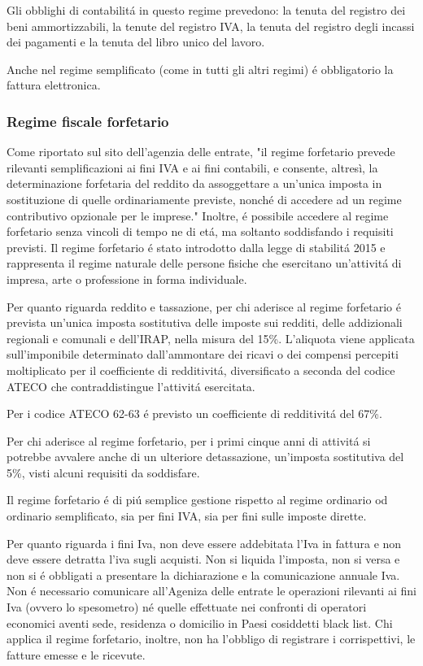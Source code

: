 \documentclass{article}
\begin{document}
Gli obblighi di contabilit\'a in questo regime prevedono: la tenuta del registro dei beni ammortizzabili, la tenute del registro IVA, la tenuta del registro degli incassi dei pagamenti e la tenuta del libro unico del lavoro. 

Anche nel regime semplificato (come in tutti gli altri regimi) \'e obbligatorio la fattura elettronica.

\subsubsection{Regime fiscale forfetario}
Come riportato sul sito dell'agenzia delle entrate, "il regime forfetario prevede rilevanti semplificazioni ai fini IVA e ai fini contabili, e consente, altresì, la determinazione forfetaria del reddito da assoggettare a un’unica imposta in sostituzione di quelle ordinariamente previste, nonché di accedere ad un regime contributivo opzionale per le imprese."
Inoltre, \'e possibile accedere al regime forfetario senza vincoli di tempo ne di et\'a, ma soltanto soddisfando i requisiti previsti.
Il regime forfetario \'e stato introdotto dalla legge di stabilit\'a 2015 e rappresenta il regime naturale delle persone fisiche che esercitano un'attivit\'a di impresa, arte o professione in forma individuale.

Per quanto riguarda reddito e tassazione, per chi aderisce al regime forfetario \'e prevista un'unica imposta sostitutiva delle imposte sui redditi, delle addizionali regionali e comunali e dell'IRAP, nella misura del 15\%. 
L'aliquota viene applicata sull'imponibile determinato dall'ammontare dei ricavi o dei compensi percepiti moltiplicato per il coefficiente di redditivit\'a, diversificato a seconda del codice ATECO che contraddistingue l'attivit\'a esercitata.

Per i codice ATECO 62-63 \'e previsto un coefficiente di redditivit\'a del 67\%.

Per chi aderisce al regime forfetario, per i primi cinque anni di attivit\'a si potrebbe avvalere anche di un ulteriore detassazione, un'imposta sostitutiva del 5\%, visti alcuni requisiti da soddisfare.

Il regime forfetario \'e di pi\'u semplice gestione rispetto al regime ordinario od ordinario semplificato, sia per fini IVA, sia per fini sulle imposte dirette. 

Per quanto riguarda i fini Iva, non deve essere addebitata l'Iva in fattura e non deve essere detratta l'iva sugli acquisti. Non si liquida l'imposta, non si versa e non si \'e obbligati a presentare la dichiarazione e la comunicazione annuale Iva. 
Non \'e necessario comunicare all'Ageniza delle entrate le operazioni rilevanti ai fini Iva (ovvero lo spesometro) né quelle effettuate nei confronti di operatori economici aventi sede, residenza o domicilio in Paesi cosiddetti black list. Chi applica il regime forfetario, inoltre, non ha l'obbligo di registrare i corrispettivi, le fatture emesse e le ricevute.
\end{document}
